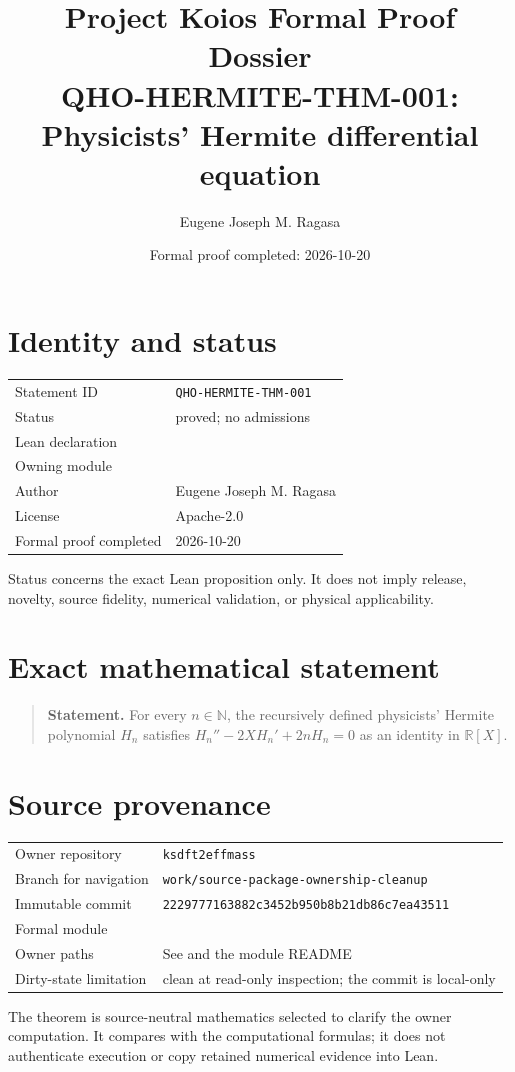 \documentclass[11pt]{article}
\title{Project Koios Formal Proof Dossier\\\large QHO-HERMITE-THM-001: Physicists' Hermite differential equation}
\author{Eugene Joseph M. Ragasa}
\date{Formal proof completed: 2026-10-20}
\begin{document}
\maketitle

\section{Identity and status}
\begin{tabularx}{\textwidth}{@{}lY@{}}\toprule
Statement ID & \texttt{QHO-HERMITE-THM-001} \\
Status & proved; no admissions \\
Lean declaration &  \\
Owning module &  \\
Author & Eugene Joseph M. Ragasa \\
License & Apache-2.0 \\
Formal proof completed & 2026-10-20 \\
\bottomrule\end{tabularx}
Status concerns the exact Lean proposition only. It does not imply release, novelty,
source fidelity, numerical validation, or physical applicability.

\section{Exact mathematical statement}
\begin{quote}\textbf{Statement.} For every $n\in\mathbb N$, the recursively defined physicists' Hermite polynomial $H_n$ satisfies $H_n''-2XH_n'+2nH_n=0$ as an identity in $\mathbb R[X]$.\end{quote}

\section{Source provenance}
\begin{tabularx}{\textwidth}{@{}lY@{}}\toprule
Owner repository & \texttt{ksdft2effmass} \\
Branch for navigation & \texttt{work/source-package-ownership-cleanup} \\
Immutable commit & \texttt{2229777163882c3452b950b8b21db86c7ea43511} \\
Formal module &  \\
Owner paths & See  and the module README \\
Dirty-state limitation & clean at read-only inspection; the commit is local-only \\
\bottomrule\end{tabularx}
The theorem is source-neutral mathematics selected to clarify the owner computation. It
compares with the computational formulas; it does not authenticate execution or copy
retained numerical evidence into Lean.
\end{document}
